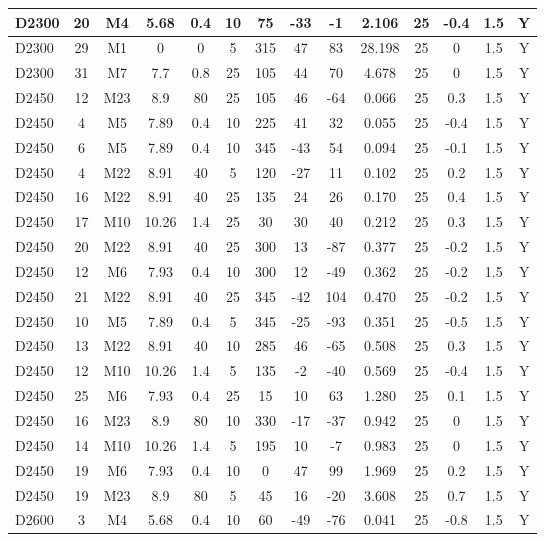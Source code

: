 \documentclass{article}
\begin{document}
\begin{center}
\begin{longtable}{|l|c|c|c|c|c|c|c|c|c|c|c|c|c|}
D2300	&	20	&	M4	&	5.68	&	0.4	&	10	&	75	&	-33	&	-1	&	2.106	&	25	&	-0.4	&	1.5	&	Y	\\\hline
D2300	&	29	&	M1	&	0	&	0	&	5	&	315	&	47	&	83	&	28.198	&	25	&	0	&	1.5	&	Y	\\\hline
D2300	&	31	&	M7	&	7.7	&	0.8	&	25	&	105	&	44	&	70	&	4.678	&	25	&	0	&	1.5	&	Y	\\\hline
D2450	&	12	&	M23	&	8.9	&	80	&	25	&	105	&	46	&	-64	&	0.066	&	25	&	0.3	&	1.5	&	Y	\\\hline
D2450	&	4	&	M5	&	7.89	&	0.4	&	10	&	225	&	41	&	32	&	0.055	&	25	&	-0.4	&	1.5	&	Y	\\\hline
D2450	&	6	&	M5	&	7.89	&	0.4	&	10	&	345	&	-43	&	54	&	0.094	&	25	&	-0.1	&	1.5	&	Y	\\\hline
D2450	&	4	&	M22	&	8.91	&	40	&	5	&	120	&	-27	&	11	&	0.102	&	25	&	0.2	&	1.5	&	Y	\\\hline
D2450	&	16	&	M22	&	8.91	&	40	&	25	&	135	&	24	&	26	&	0.170	&	25	&	0.4	&	1.5	&	Y	\\\hline
D2450	&	17	&	M10	&	10.26	&	1.4	&	25	&	30	&	30	&	40	&	0.212	&	25	&	0.3	&	1.5	&	Y	\\\hline
D2450	&	20	&	M22	&	8.91	&	40	&	25	&	300	&	13	&	-87	&	0.377	&	25	&	-0.2	&	1.5	&	Y	\\\hline
D2450	&	12	&	M6	&	7.93	&	0.4	&	10	&	300	&	12	&	-49	&	0.362	&	25	&	-0.2	&	1.5	&	Y	\\\hline
D2450	&	21	&	M22	&	8.91	&	40	&	25	&	345	&	-42	&	104	&	0.470	&	25	&	-0.2	&	1.5	&	Y	\\\hline
D2450	&	10	&	M5	&	7.89	&	0.4	&	5	&	345	&	-25	&	-93	&	0.351	&	25	&	-0.5	&	1.5	&	Y	\\\hline
D2450	&	13	&	M22	&	8.91	&	40	&	10	&	285	&	46	&	-65	&	0.508	&	25	&	0.3	&	1.5	&	Y	\\\hline
D2450	&	12	&	M10	&	10.26	&	1.4	&	5	&	135	&	-2	&	-40	&	0.569	&	25	&	-0.4	&	1.5	&	Y	\\\hline
D2450	&	25	&	M6	&	7.93	&	0.4	&	25	&	15	&	10	&	63	&	1.280	&	25	&	0.1	&	1.5	&	Y	\\\hline
D2450	&	16	&	M23	&	8.9	&	80	&	10	&	330	&	-17	&	-37	&	0.942	&	25	&	0	&	1.5	&	Y	\\\hline
D2450	&	14	&	M10	&	10.26	&	1.4	&	5	&	195	&	10	&	-7	&	0.983	&	25	&	0	&	1.5	&	Y	\\\hline
D2450	&	19	&	M6	&	7.93	&	0.4	&	10	&	0	&	47	&	99	&	1.969	&	25	&	0.2	&	1.5	&	Y	\\\hline
D2450	&	19	&	M23	&	8.9	&	80	&	5	&	45	&	16	&	-20	&	3.608	&	25	&	0.7	&	1.5	&	Y	\\\hline
D2600	&	3	&	M4	&	5.68	&	0.4	&	10	&	60	&	-49	&	-76	&	0.041	&	25	&	-0.8	&	1.5	&	Y	\\\hline

\end{longtable}
\end{center}
\end{document}
